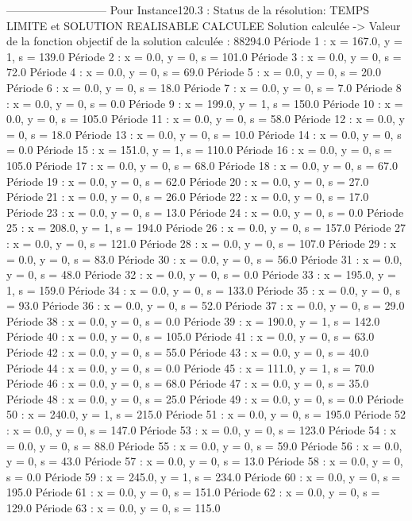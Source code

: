 ---------------------------
Pour Instance120.3 :
Status de la résolution: TEMPS LIMITE et SOLUTION REALISABLE CALCULEE
Solution calculée
-> Valeur de la fonction objectif de la solution calculée :  88294.0
Période 1 : x = 167.0, y = 1, s = 139.0
Période 2 : x = 0.0, y = 0, s = 101.0
Période 3 : x = 0.0, y = 0, s = 72.0
Période 4 : x = 0.0, y = 0, s = 69.0
Période 5 : x = 0.0, y = 0, s = 20.0
Période 6 : x = 0.0, y = 0, s = 18.0
Période 7 : x = 0.0, y = 0, s = 7.0
Période 8 : x = 0.0, y = 0, s = 0.0
Période 9 : x = 199.0, y = 1, s = 150.0
Période 10 : x = 0.0, y = 0, s = 105.0
Période 11 : x = 0.0, y = 0, s = 58.0
Période 12 : x = 0.0, y = 0, s = 18.0
Période 13 : x = 0.0, y = 0, s = 10.0
Période 14 : x = 0.0, y = 0, s = 0.0
Période 15 : x = 151.0, y = 1, s = 110.0
Période 16 : x = 0.0, y = 0, s = 105.0
Période 17 : x = 0.0, y = 0, s = 68.0
Période 18 : x = 0.0, y = 0, s = 67.0
Période 19 : x = 0.0, y = 0, s = 62.0
Période 20 : x = 0.0, y = 0, s = 27.0
Période 21 : x = 0.0, y = 0, s = 26.0
Période 22 : x = 0.0, y = 0, s = 17.0
Période 23 : x = 0.0, y = 0, s = 13.0
Période 24 : x = 0.0, y = 0, s = 0.0
Période 25 : x = 208.0, y = 1, s = 194.0
Période 26 : x = 0.0, y = 0, s = 157.0
Période 27 : x = 0.0, y = 0, s = 121.0
Période 28 : x = 0.0, y = 0, s = 107.0
Période 29 : x = 0.0, y = 0, s = 83.0
Période 30 : x = 0.0, y = 0, s = 56.0
Période 31 : x = 0.0, y = 0, s = 48.0
Période 32 : x = 0.0, y = 0, s = 0.0
Période 33 : x = 195.0, y = 1, s = 159.0
Période 34 : x = 0.0, y = 0, s = 133.0
Période 35 : x = 0.0, y = 0, s = 93.0
Période 36 : x = 0.0, y = 0, s = 52.0
Période 37 : x = 0.0, y = 0, s = 29.0
Période 38 : x = 0.0, y = 0, s = 0.0
Période 39 : x = 190.0, y = 1, s = 142.0
Période 40 : x = 0.0, y = 0, s = 105.0
Période 41 : x = 0.0, y = 0, s = 63.0
Période 42 : x = 0.0, y = 0, s = 55.0
Période 43 : x = 0.0, y = 0, s = 40.0
Période 44 : x = 0.0, y = 0, s = 0.0
Période 45 : x = 111.0, y = 1, s = 70.0
Période 46 : x = 0.0, y = 0, s = 68.0
Période 47 : x = 0.0, y = 0, s = 35.0
Période 48 : x = 0.0, y = 0, s = 25.0
Période 49 : x = 0.0, y = 0, s = 0.0
Période 50 : x = 240.0, y = 1, s = 215.0
Période 51 : x = 0.0, y = 0, s = 195.0
Période 52 : x = 0.0, y = 0, s = 147.0
Période 53 : x = 0.0, y = 0, s = 123.0
Période 54 : x = 0.0, y = 0, s = 88.0
Période 55 : x = 0.0, y = 0, s = 59.0
Période 56 : x = 0.0, y = 0, s = 43.0
Période 57 : x = 0.0, y = 0, s = 13.0
Période 58 : x = 0.0, y = 0, s = 0.0
Période 59 : x = 245.0, y = 1, s = 234.0
Période 60 : x = 0.0, y = 0, s = 195.0
Période 61 : x = 0.0, y = 0, s = 151.0
Période 62 : x = 0.0, y = 0, s = 129.0
Période 63 : x = 0.0, y = 0, s = 115.0
